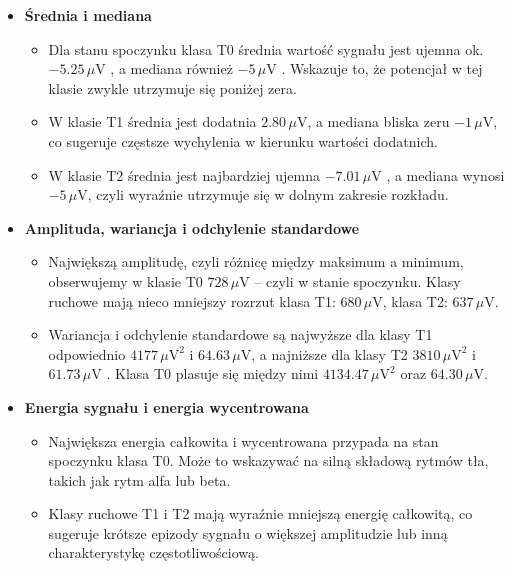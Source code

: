 \documentclass[eeg_v4.tex]{subfiles}
\begin{document}
    \begin{itemize}
        \item \textbf{Średnia i mediana}
        \begin{itemize}
            \item Dla stanu spoczynku klasa T0 średnia wartość sygnału jest ujemna ok. \(-5.25\,\mu\mathrm{V}\)
            , a mediana również \(-5\,\mu\mathrm{V}\)
            . Wskazuje to, że potencjał w tej klasie zwykle utrzymuje się poniżej zera.
            \item W klasie T1 średnia jest dodatnia \(2.80\,\mu\mathrm{V}\), a mediana bliska zeru
            \(-1\,\mu\mathrm{V}\), co sugeruje częstsze wychylenia w kierunku wartości dodatnich.
            \item W klasie T2 średnia jest najbardziej ujemna \(-7.01\,\mu\mathrm{V}\)
            , a mediana wynosi \(-5\,\mu\mathrm{V}\), czyli wyraźnie utrzymuje się w dolnym zakresie rozkładu.
        \end{itemize}

        \item \textbf{Amplituda, wariancja i odchylenie standardowe}
        \begin{itemize}
            \item Największą amplitudę, czyli różnicę między maksimum a minimum, obserwujemy w klasie T0
            \(728\,\mu\mathrm{V}\) – czyli w stanie spoczynku. Klasy ruchowe mają nieco mniejszy rozrzut klasa T1:
            \(680\,\mu\mathrm{V}\), klasa T2: \(637\,\mu\mathrm{V}\).
            \item Wariancja i odchylenie standardowe są najwyższe dla klasy T1 odpowiednio \(4177\,\mu\mathrm{V}^2\) i
            \(64.63\,\mu\mathrm{V}\), a najniższe dla klasy T2 \(3810\,\mu\mathrm{V}^2\) i \(61.73\,\mu\mathrm{V}\)
            . Klasa T0 plasuje się między nimi \(4134.47\,\mu\mathrm{V}^2\) oraz \(64.30\,\mu\mathrm{V}\).
        \end{itemize}

        \item \textbf{Energia sygnału i energia wycentrowana}
        \begin{itemize}
            \item Największa energia całkowita i wycentrowana przypada na stan spoczynku klasa T0. Może to wskazywać na
            silną składową rytmów tła, takich jak rytm alfa lub beta.
            \item
            Klasy ruchowe T1 i T2 mają wyraźnie mniejszą energię całkowitą, co sugeruje krótsze epizody sygnału
            o większej amplitudzie lub inną charakterystykę częstotliwościową.
        \end{itemize}


\end{itemize}
\end{document}
